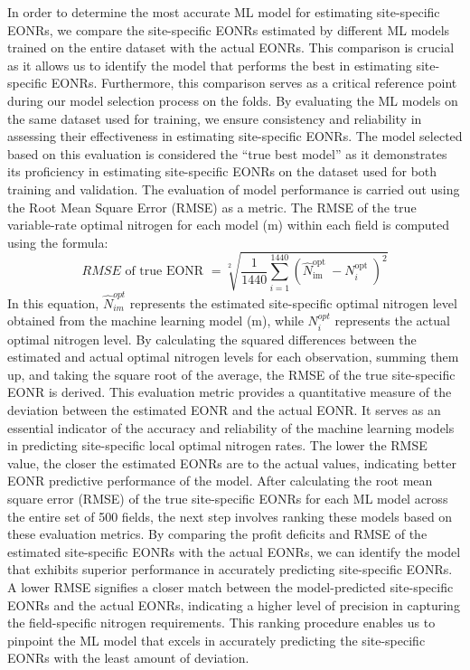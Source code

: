 \documentclass[
  12pt,
]{article}
\begin{document}
In order to determine the most accurate ML model for estimating site-specific EONRs, we compare the site-specific EONRs estimated by different ML models trained on the entire dataset with the actual EONRs. This comparison is crucial as it allows us to identify the model that performs the best in estimating site-specific EONRs.
Furthermore, this comparison serves as a critical reference point during our model selection process on the folds. By evaluating the ML models on the same dataset used for training, we ensure consistency and reliability in assessing their effectiveness in estimating site-specific EONRs. The model selected based on this evaluation is considered the ``true best model'' as it demonstrates its proficiency in estimating site-specific EONRs on the dataset used for both training and validation.
The evaluation of model performance is carried out using the Root Mean Square Error (RMSE) as a metric. The RMSE of the true variable-rate optimal nitrogen for each model (m) within each field is computed using the formula:
\[
R M S E \text { of true EONR }=\sqrt[2]{\frac{1}{1440} \sum_{i=1}^{1440}\left(\widehat{N}_{\text {im }}^{\text {opt }}-N_i^{\text {opt }}\right)^2}
\]
In this equation, \({\hat{N}}_{im}^{opt}\) represents the estimated site-specific optimal nitrogen level obtained from the machine learning model (m), while \(N_i^{opt}\) represents the actual optimal nitrogen level. By calculating the squared differences between the estimated and actual optimal nitrogen levels for each observation, summing them up, and taking the square root of the average, the RMSE of the true site-specific EONR is derived.
This evaluation metric provides a quantitative measure of the deviation between the estimated EONR and the actual EONR. It serves as an essential indicator of the accuracy and reliability of the machine learning models in predicting site-specific local optimal nitrogen rates. The lower the RMSE value, the closer the estimated EONRs are to the actual values, indicating better EONR predictive performance of the model.
After calculating the root mean square error (RMSE) of the true site-specific EONRs for each ML model across the entire set of 500 fields, the next step involves ranking these models based on these evaluation metrics. By comparing the profit deficits and RMSE of the estimated site-specific EONRs with the actual EONRs, we can identify the model that exhibits superior performance in accurately predicting site-specific EONRs. A lower RMSE signifies a closer match between the model-predicted site-specific EONRs and the actual EONRs, indicating a higher level of precision in capturing the field-specific nitrogen requirements. This ranking procedure enables us to pinpoint the ML model that excels in accurately predicting the site-specific EONRs with the least amount of deviation.
\end{document}
